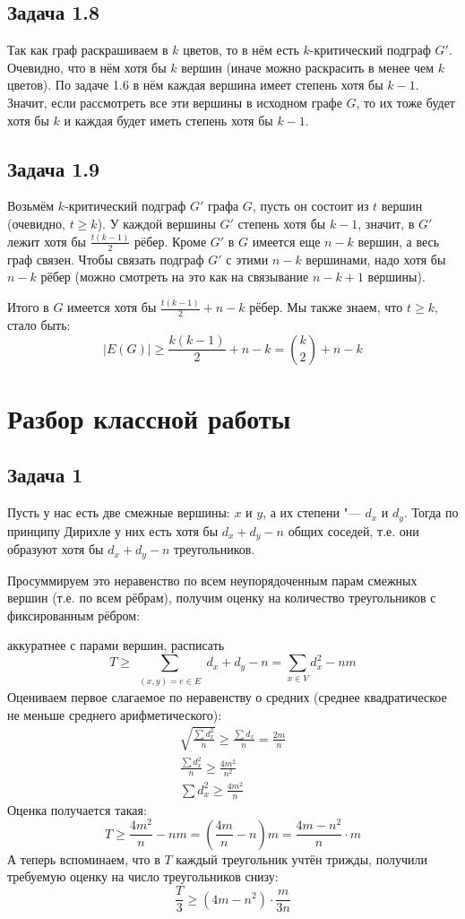 \subsection{Задача 1.8}
	Так как граф раскрашиваем в $k$ цветов, то в нём есть $k$-критический подграф $G'$.
	Очевидно, что в нём хотя бы $k$ вершин (иначе можно раскрасить в менее чем $k$ цветов).
	По задаче 1.6 в нём каждая вершина имеет степень хотя бы $k-1$.
	Значит, если рассмотреть все эти вершины в исходном графе $G$, то их тоже будет
	хотя бы $k$ и каждая будет иметь степень хотя бы $k-1$.

\subsection{Задача 1.9}
	Возьмём $k$-критический подграф $G'$ графа $G$, пусть он состоит из $t$ вершин
	(очевидно, $t \ge k$).
	У каждой вершины $G'$ степень хотя бы $k-1$, значит, в $G'$ лежит хотя бы $\frac{t(k-1)}{2}$ рёбер.
	Кроме $G'$ в $G$ имеется еще $n-k$ вершин, а весь граф связен.
	Чтобы связать подграф $G'$ с этими $n-k$ вершинами, надо хотя бы $n-k$ рёбер
	(можно смотреть на это как на связывание $n-k+1$ вершины).

	Итого в $G$ имеется хотя бы $\frac{t(k-1)}{2}+n-k$ рёбер.
	Мы также знаем, что $t\ge k$, стало быть:
	\[
		|E(G)| \ge \frac{k(k-1)}{2} + n - k = \binom{k}{2} + n - k
	\]

\section{Разбор классной работы}
\subsection{Задача 1}
	Пусть у нас есть две смежные вершины: $x$ и $y$, а их степени "--- $d_x$ и $d_y$.
	Тогда по принципу Дирихле у них есть хотя бы $d_x + d_y - n$ общих соседей,
	т.е. они образуют хотя бы $d_x + d_y - n$ треугольников.

	Просуммируем это неравенство по всем неупорядоченным парам смежных вершин (т.е. по всем рёбрам),
	получим оценку на количество треугольников с фиксированным рёбром:
	
	\TODO аккуратнее с парами вершин, расписать
	\[
		T \ge \sum_{\substack{(x, y)=e \in E}} d_x + d_y - n = \sum_{x \in V} d_x^2 - nm
	\]
	Оцениваем первое слагаемое по неравенству о средних (среднее квадратическое не меньше среднего арифметического):
	\begin{gather*}
		\label{day150416_class_prob1_ineq}
		\sqrt{\frac{\sum d_x^2}{n}} \ge \frac{\sum d_x}{n} = \frac{2m}{n} \\
		\frac{\sum d_x^2}{n} \ge \frac{4m^2}{n^2} \\
		\sum d_x^2 \ge \frac{4m^2}{n}
	\end{gather*}
	Оценка получается такая:
	\[
		T \ge \frac{4m^2}{n} - nm = \left(\frac{4m}{n}-n\right)m = \frac{4m-n^2}{n} \cdot m
	\]
	А теперь вспоминаем, что в $T$ каждый треугольник учтён трижды, получили требуемую оценку на число треугольников снизу:
	\[ \frac{T}{3} \ge (4m-n^2) \cdot \frac{m}{3n} \]

